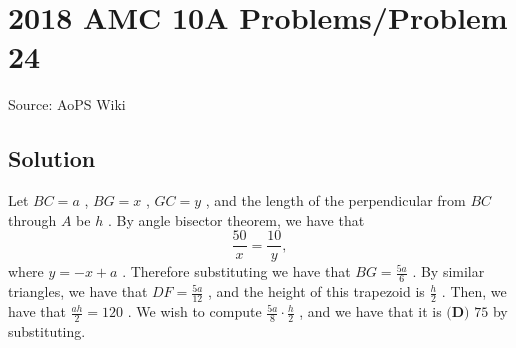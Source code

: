 \documentclass[12pt]{article}
\begin{document}
\section*{{2018 AMC 10A Problems/Problem 24}}
Source: AoPS Wiki

\subsection*{Solution}
Let $BC = a$ , $BG = x$ , $GC = y$ , and the length of the perpendicular from $BC$ through $A$ be $h$ . By angle bisector theorem, we have that \[\frac{50}{x} = \frac{10}{y},\] where $y = -x+a$ . Therefore substituting we have that $BG=\frac{5a}{6}$ . By similar triangles, we have that $DF=\frac{5a}{12}$ , and the height of this trapezoid is $\frac{h}{2}$ . Then, we have that $\frac{ah}{2}=120$ . We wish to compute $\frac{5a}{8}\cdot\frac{h}{2}$ , and we have that it is $\boxed{\textbf{(D) }75}$ by substituting.
\end{document}
